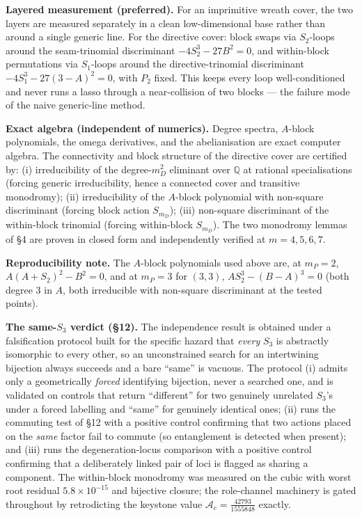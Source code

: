 \documentclass[11pt]{article}
\theoremstyle{plain}
\theoremstyle{definition}
\theoremstyle{remark}
\begin{document}
\textbf{Layered measurement (preferred).} For an imprimitive wreath cover, the two layers are measured separately in a clean low-dimensional base rather than around a single generic line. For the directive cover: block swaps via \(S_2\)-loops around the seam-trinomial discriminant \(-4S_2^3 - 27 B^2 = 0\), and within-block permutations via \(S_1\)-loops around the directive-trinomial discriminant \(-4S_1^3 - 27(3-A)^2 = 0\), with \(P_2\) fixed. This keeps every loop well-conditioned and never runs a lasso through a near-collision of two blocks --- the failure mode of the naive generic-line method.

\textbf{Exact algebra (independent of numerics).} Degree spectra, \(A\)-block polynomials, the omega derivatives, and the abelianisation are exact computer algebra. The connectivity and block structure of the directive cover are certified by: (i) irreducibility of the degree-\(m_D^2\) eliminant over \(\mathbb Q\) at rational specialisations (forcing generic irreducibility, hence a connected cover and transitive monodromy); (ii) irreducibility of the \(A\)-block polynomial with non-square discriminant (forcing block action \(S_{m_D}\)); (iii) non-square discriminant of the within-block trinomial (forcing within-block \(S_{m_D}\)). The two monodromy lemmas of §4 are proven in closed form and independently verified at \(m = 4,5,6,7\).

\textbf{Reproducibility note.} The \(A\)-block polynomials used above are, at \(m_P=2\), \(A(A+S_2)^2 - B^2 = 0\), and at \(m_P=3\) for \((3,3)\), \(A S_2^3 - (B-A)^3 = 0\) (both degree \(3\) in \(A\), both irreducible with non-square discriminant at the tested points).

\textbf{The same-\(S_3\) verdict (§12).} The independence result is obtained under a falsification protocol built for the specific hazard that \emph{every} \(S_3\) is abstractly isomorphic to every other, so an unconstrained search for an intertwining bijection always succeeds and a bare ``same'' is vacuous. The protocol (i) admits only a geometrically \emph{forced} identifying bijection, never a searched one, and is validated on controls that return ``different'' for two genuinely unrelated \(S_3\)'s under a forced labelling and ``same'' for genuinely identical ones; (ii) runs the commuting test of §12 with a positive control confirming that two actions placed on the \emph{same} factor fail to commute (so entanglement is detected when present); and (iii) runs the degeneration-locus comparison with a positive control confirming that a deliberately linked pair of loci is flagged as sharing a component. The within-block monodromy was measured on the cubic with worst root residual \(5.8\times10^{-15}\) and bijective closure; the role-channel machinery is gated throughout by retrodicting the keystone value \(\mathcal A_c = \tfrac{42793}{1555848}\) exactly.
\end{document}

